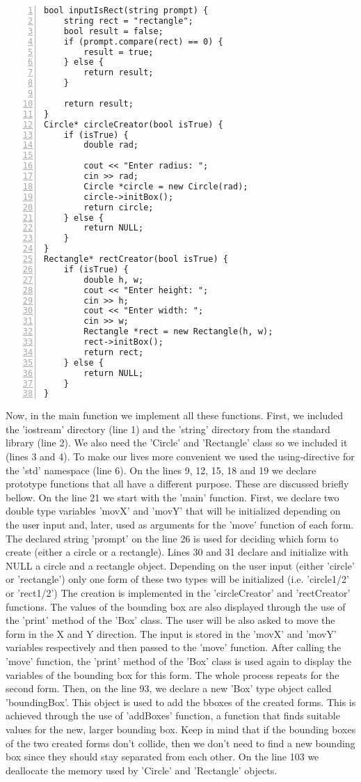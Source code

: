 \documentclass{article}
\begin{document}
\begin{lstlisting}[basicstyle=\footnotesize\ttfamily, numbers=left, stepnumber=1, numberstyle = \normalsize]
bool inputIsRect(string prompt) {
	string rect = "rectangle";
	bool result = false;
	if (prompt.compare(rect) == 0) {
		result = true;
	} else {
		return result;
	}

	return result;
}
Circle* circleCreator(bool isTrue) {
	if (isTrue) {
		double rad;

		cout << "Enter radius: ";
		cin >> rad;
		Circle *circle = new Circle(rad);
		circle->initBox();
		return circle;
	} else {
		return NULL;
	}
}
Rectangle* rectCreator(bool isTrue) {
	if (isTrue) {
		double h, w;
		cout << "Enter height: ";
		cin >> h;
		cout << "Enter width: ";
		cin >> w;
		Rectangle *rect = new Rectangle(h, w);
		rect->initBox();
		return rect;
	} else {
		return NULL;
	}
}
\end{lstlisting}
\normalsize{
Now, in the main function we implement all these functions. First, we included the 'iostream' directory (line 1) and the 'string' directory from the standard library (line 2).
We also need the 'Circle' and 'Rectangle' class so we included it (lines 3 and 4). To make our lives more convenient we used the using-directive for the 'std' namespace (line 6).
On the lines 9, 12, 15, 18 and 19 we declare prototype functions that all have a different purpose. These are discussed briefly bellow.
On the line 21 we start with the 'main' function. First, we declare two double type variables 'movX' and 'movY' that will be initialized depending on the user input and, later, used as arguments for the 'move' function of each form.
The declared string 'prompt' on the line 26 is used for deciding which form to create (either a circle or a rectangle).
Lines 30 and 31 declare and initialize with NULL a circle and a rectangle object.
Depending on the user input (either 'circle' or 'rectangle') only one form of these two types will be initialized (i.e. 'circle1/2' or 'rect1/2')
The creation is implemented in the 'circleCreator' and 'rectCreator' functions. The values of the bounding box are also displayed through the use of the 'print' method of the 'Box' class.
The user will be also asked to move the form in the X and Y direction. The input is stored in the 'movX' and 'movY' variables respectively and then passed to the 'move' function.
After calling the 'move' function, the 'print' method of the 'Box' class is used again to display the variables of the bounding box for this form.
The whole process repeats for the second form.
Then, on the line 93, we declare a new 'Box' type object called 'boundingBox'. This object is used to add the bboxes of the created forms. This is achieved through the use of 'addBoxes' function, a function that finds suitable values for the new, larger bounding box. Keep in mind that if the bounding boxes of the two created forms don't collide, then we don't need to find a new bounding box since they should stay separated from each other.
On the line 103 we deallocate the memory used by 'Circle' and 'Rectangle' objects.
\newline
}
\end{document}

